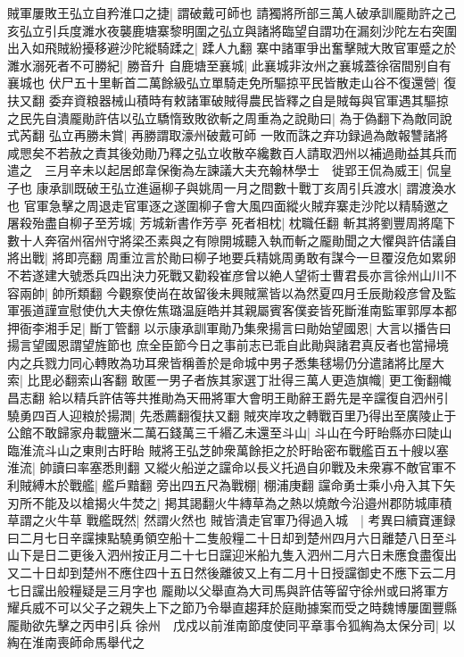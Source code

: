 賊軍屢敗王弘立自矜淮口之捷|{
	謂破戴可師也}
請獨將所部三萬人破承訓龎勛許之己亥弘立引兵度濉水夜襲鹿塘寨黎明圍之弘立與諸將臨望自謂功在漏刻沙陀左右突圍出入如飛賊紛擾移避沙陀縱騎蹂之|{
	蹂人九翻}
寨中諸軍爭出奮擊賊大敗官軍蹙之於濉水溺死者不可勝紀|{
	勝音升}
自鹿塘至襄城|{
	此襄城非汝州之襄城蓋徐宿間别自有襄城也}
伏尸五十里斬首二萬餘級弘立單騎走免所驅掠平民皆散走山谷不復還營|{
	復扶又翻}
委弃資粮器械山積時有敕諸軍破賊得農民皆釋之自是賊每與官軍遇其驅掠之民先自潰龎勛許佶以弘立驕惰致敗欲斬之周重為之說勛曰|{
	為于偽翻下為敵同說式芮翻}
弘立再勝未賞|{
	再勝謂取濠州破戴可師}
一敗而誅之弃功録過為敵報讐諸將咸愳矣不若赦之責其後効勛乃釋之弘立收散卒纔數百人請取泗州以補過勛益其兵而遣之　三月辛未以起居郎韋保衡為左諫議大夫充翰林學士　徙郢王侃為威王|{
	侃皇子也}
康承訓既破王弘立進逼柳子與姚周一月之間數十戰丁亥周引兵渡水|{
	謂渡渙水也}
官軍急擊之周退走官軍逐之遂圍柳子會大風四面縱火賊弃寨走沙陀以精騎邀之屠殺殆盡自柳子至芳城|{
	芳城新書作芳亭}
死者相枕|{
	枕職任翻}
斬其將劉豐周將麾下數十人奔宿州宿州守將梁丕素與之有隙開城聽入執而斬之龎勛聞之大懼與許佶議自將出戰|{
	將即亮翻}
周重泣言於勛曰柳子地要兵精姚周勇敢有謀今一旦覆沒危如累卵不若遂建大號悉兵四出決力死戰又勸殺崔彦曾以絶人望術士曹君長亦言徐州山川不容兩帥|{
	帥所類翻}
今觀察使尚在故留後未興賊黨皆以為然夏四月壬辰勛殺彦曾及監軍張道謹宣慰使仇大夫僚佐焦璐温庭皓并其親屬賓客僕妾皆死斷淮南監軍郭厚本都押衙李湘手足|{
	斷丁管翻}
以示康承訓軍勛乃集衆揚言曰勛始望國恩|{
	大言以播告曰揚言望國恩謂望旌節也}
庶全臣節今日之事前志已乖自此勛與諸君真反者也當掃境内之兵戮力同心轉敗為功耳衆皆稱善於是命城中男子悉集毬場仍分遣諸將比屋大索|{
	比毘必翻索山客翻}
敢匿一男子者族其家選丁壯得三萬人更造旗幟|{
	更工衡翻幟昌志翻}
給以精兵許佶等共推勛為天冊將軍大會明王勛辭王爵先是辛讜復自泗州引驍勇四百人迎粮於揚潤|{
	先悉薦翻復扶又翻}
賊夾岸攻之轉戰百里乃得出至廣陵止于公館不敢歸家舟載鹽米二萬石錢萬三千緡乙未還至斗山|{
	斗山在今盱眙縣亦曰陡山臨淮流斗山之東則古盱眙}
賊將王弘芝帥衆萬餘拒之於盱眙密布戰艦百五十艘以塞淮流|{
	帥讀曰率塞悉則翻}
又縱火船逆之讜命以長义托過自卯戰及未衆寡不敵官軍不利賊縛木於戰艦|{
	艦戶黯翻}
旁出四五尺為戰棚|{
	棚浦庚翻}
讜命勇士乘小舟入其下矢刃所不能及以槍揭火牛焚之|{
	掲其謁翻火牛縳草為之熱以燒敵今沿邉州郡防城庫積草謂之火牛草}
戰艦既然|{
	然謂火然也}
賊皆潰走官軍乃得過入城　|{
	考異曰續寶運録曰二月七日辛讜㨂點驍勇領空船十二隻般糧二十日却到楚州四月六日離楚八日至斗山下是日二更後入泗州按正月二十七日讜迎米船九隻入泗州二月六日未應食盡復出又二十日却到楚州不應住四十五日然後離彼又上有二月十日授讜御史不應下云二月七日讜出般糧疑是三月字也}
龎勛以父舉直為大司馬與許佶等留守徐州或曰將軍方耀兵威不可以父子之親失上下之節乃令舉直趨拜於庭勛據案而受之時魏博屢圍豐縣龎勛欲先擊之丙申引兵徐州　戊戍以前淮南節度使同平章事令狐綯為太保分司|{
	以綯在淮南喪師命馬舉代之}
